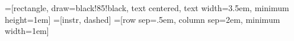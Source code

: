 
\usepackage{tikz}
\usetikzlibrary{matrix,arrows}

=[rectangle, draw=black!85!black, text centered, text width=3.5em, minimum height=1em] %
=[instr, dashed] %
=[row sep=.5em, column sep=2em, minimum width=1em] %
